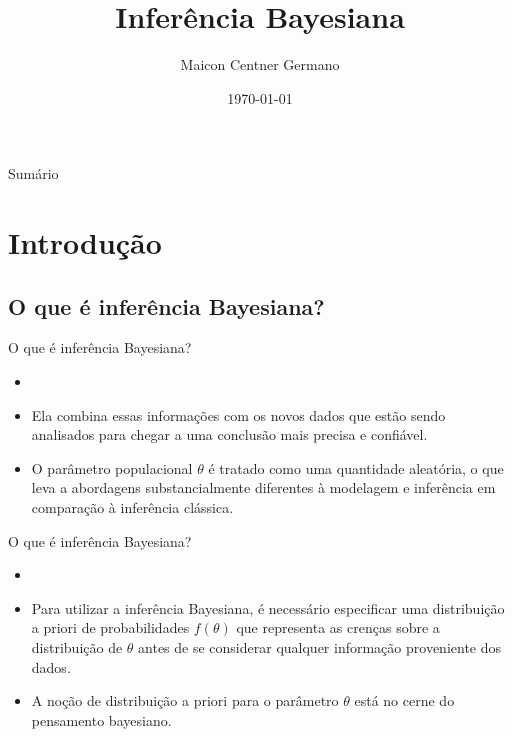 \documentclass{beamer}
\title{Inferência Bayesiana}
\author{Maicon Centner Germano}
\institute{IBB UNESP}
\date{\today}
\theoremstyle{definition}
\begin{document}
\begin{frame}
  \titlepage
\end{frame}

\begin{frame}{Sumário}
  \tableofcontents
\end{frame}

\section{Introdução}

\subsection{O que é inferência Bayesiana?}
\begin{frame}{O que é inferência Bayesiana?}
\begin{itemize}
\item {}
\vspace{0.2cm}
\item Ela combina essas informações com os novos dados que estão sendo analisados para chegar a uma conclusão mais precisa e confiável.
\vspace{0.2cm}
\item O parâmetro populacional $\theta$ é tratado como uma quantidade aleatória, o que leva a abordagens substancialmente diferentes à modelagem e inferência em comparação à inferência clássica.
\end{itemize}
\end{frame}

\begin{frame}{O que é inferência Bayesiana?}
\begin{itemize}
\item {}
\vspace{0.2cm}
\item Para utilizar a inferência Bayesiana, é necessário especificar uma distribuição a priori de probabilidades $f(\theta)$ que representa as crenças sobre a distribuição de $\theta$ antes de se considerar qualquer informação proveniente dos dados.
\vspace{0.2cm}
\item A noção de distribuição a priori para o parâmetro $\theta$ está no cerne do pensamento bayesiano.

\end{itemize}
    
\end{frame}
\end{document}
